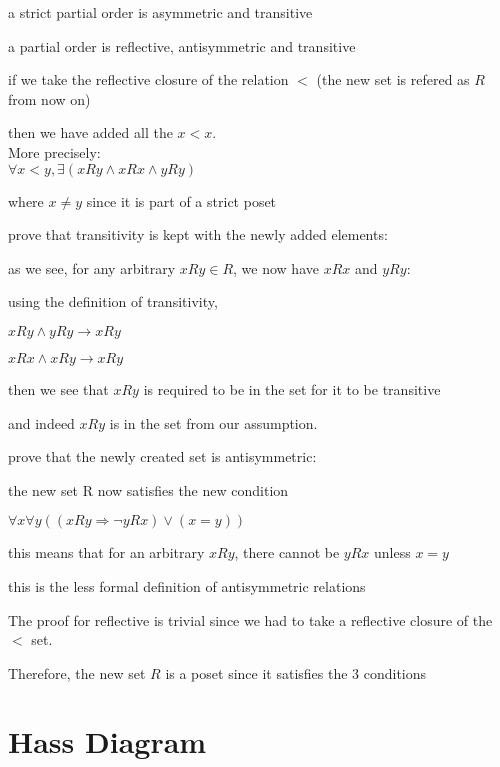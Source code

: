 \documentclass[12pts,A4]{article}
\begin{document}
\begin{flushleft}

    a strict partial order is asymmetric and transitive

    a partial order is reflective, antisymmetric and transitive

    \bigskip


    if we take the reflective closure of the relation $ < $ 
    (the new set is refered as $R$ from now on)

    then we have added all the $x<x$.\\

    More precisely: \\
    $ \forall x<y  , \exists (xRy \wedge xRx \wedge yRy)$

    where $ x \not = y$ since it is part of a strict poset 


    prove that transitivity is kept with the newly added elements:
    \bigskip

    as we see, for any arbitrary $xRy \in R$, we now have $xRx$ and $yRy$:

    using the definition of transitivity,
    
    $xRy \wedge yRy \rightarrow xRy$

    $xRx \wedge xRy \rightarrow xRy$
    
    then we see that $xRy$ is required to be in the set for it to be transitive

    and indeed $xRy$ is in the set from our assumption.
    \bigskip

    prove that the newly created set is antisymmetric:

    the new set R now satisfies the new condition 

    $ \forall x \forall y ((xRy \Rightarrow \neg yRx) \vee (x = y))$
    
    this means that for an arbitrary $xRy$, 
    there cannot be $yRx$ unless $ x = y$

    this is the less formal definition of antisymmetric relations
    
    \bigskip
    The proof for reflective is trivial since we had to take a reflective closure of the $<$ set.
    \bigskip

    Therefore, the new set $R$ is a poset since it satisfies the 3 conditions


    
\end{flushleft}

\section{Hass Diagram}
\end{document}
